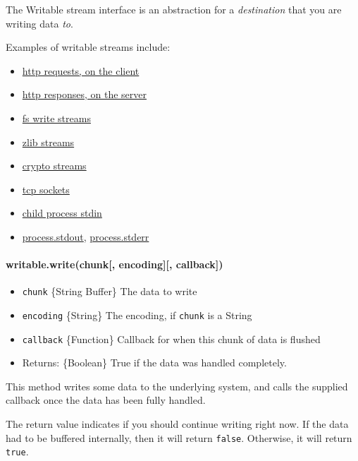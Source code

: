 The Writable stream interface is an abstraction for a \emph{destination}
that you are writing data \emph{to}.

Examples of writable streams include:

\begin{itemize}
\itemsep1pt\parskip0pt
\item
  \href{http.html\#http_class_http_clientrequest}{http requests, on the
  client}
\item
  \href{http.html\#http_class_http_serverresponse}{http responses, on
  the server}
\item
  \href{fs.html\#fs_class_fs_writestream}{fs write streams}
\item
  \href{zlib.html}{zlib streams}
\item
  \href{crypto.html}{crypto streams}
\item
  \href{net.html\#net_class_net_socket}{tcp sockets}
\item
  \href{child_process.html\#child_process_child_stdin}{child process
  stdin}
\item
  \href{process.html\#process_process_stdout}{process.stdout},
  \href{process.html\#process_process_stderr}{process.stderr}
\end{itemize}

\paragraph{writable.write(chunk{[}, encoding{]}{[},
callback{]})}\label{writable.writechunk-encoding-callback}

\begin{itemize}
\itemsep1pt\parskip0pt
\item
  \texttt{chunk} \{String \textbar{} Buffer\} The data to write
\item
  \texttt{encoding} \{String\} The encoding, if \texttt{chunk} is a
  String
\item
  \texttt{callback} \{Function\} Callback for when this chunk of data is
  flushed
\item
  Returns: \{Boolean\} True if the data was handled completely.
\end{itemize}

This method writes some data to the underlying system, and calls the
supplied callback once the data has been fully handled.

The return value indicates if you should continue writing right now. If
the data had to be buffered internally, then it will return
\texttt{false}. Otherwise, it will return \texttt{true}.

